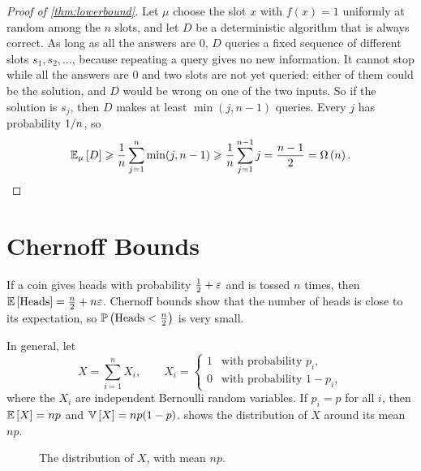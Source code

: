 \begin{proof}[Proof of \cref{thm:lowerbound}]
    Let $\mu$ choose the slot $x$ with $f(x) = 1$ uniformly at random among the $n$ slots, and let $D$
    be a deterministic algorithm that is always correct. As long as all the answers are $0$, $D$
    queries a fixed sequence of different slots $s_1, s_2, \dots$, because repeating a query gives no
    new information. It cannot stop while all the answers are $0$ and two slots are not yet queried:
    either of them could be the solution, and $D$ would be wrong on one of the two inputs. So if the
    solution is $s_j$, then $D$ makes at least $\min(j, n-1)$ queries. Every $j$ has probability
    $1/n$, so
    \[\operatorname{\mathbb{E}}_{\mu}\left[D\right] \geqslant \frac{1}{n} \sum_{j=1}^{n} \min(j, n-1)
        \geqslant \frac{1}{n} \sum_{j=1}^{n-1} j = \frac{n-1}{2} = \Omega\left(n\right). \qedhere\]
\end{proof}

\section{Chernoff Bounds}

If a coin gives heads with probability $\frac{1}{2} + \varepsilon$ and is tossed $n$ times, then
$\operatorname{\mathbb{E}}\left[\text{Heads}\right] = \frac{n}{2} + n\varepsilon$. Chernoff bounds show that the number of heads is
close to its expectation, so $\operatorname{\mathbb{P}}\left(\text{Heads} < \frac{n}{2}\right)$ is very small.

In general, let
\[X = \sum_{i=1}^{n} X_i,
    \qquad
    X_i = \begin{cases}
        1 & \text{with probability } p_i,     \\
        0 & \text{with probability } 1 - p_i,
    \end{cases}\]
where the $X_i$ are independent Bernoulli random variables. If $p_i = p$ for all $i$, then
$\operatorname{\mathbb{E}}\left[X\right] = np$ and $\operatorname{\mathbb{V}}\left[X\right] = np(1-p)$.  shows the
distribution of $X$ around its mean $np$.

\begin{figure}[ht]
    \centering
    \caption{The distribution of $X$, with mean $np$.}
    \label{fig:chernoff-0901}
\end{figure}

